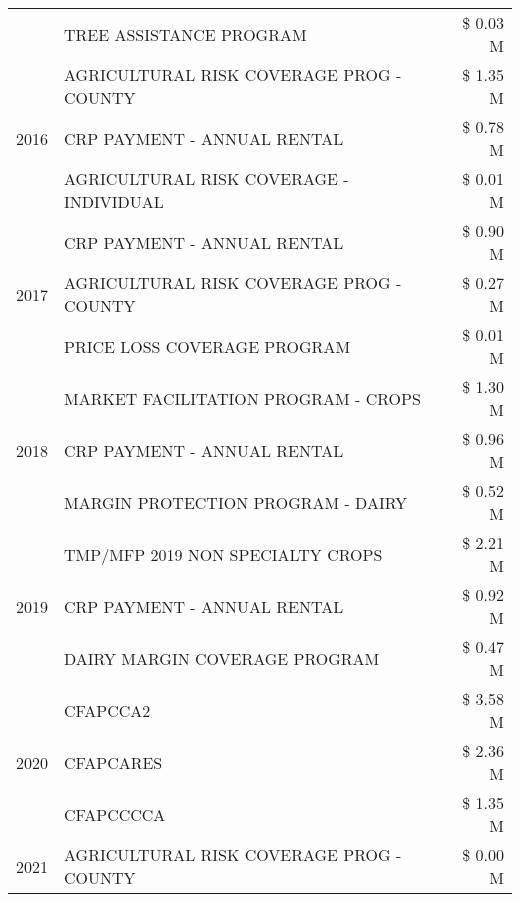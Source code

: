 \begin{tabular}{llr}
 & TREE ASSISTANCE PROGRAM & \$ 0.03 M \\
\cline{1-3}
\multirow[t]{3}{*}{2016} & AGRICULTURAL RISK COVERAGE PROG - COUNTY & \$ 1.35 M \\
 & CRP PAYMENT - ANNUAL RENTAL & \$ 0.78 M \\
 & AGRICULTURAL RISK COVERAGE - INDIVIDUAL & \$ 0.01 M \\
\cline{1-3}
\multirow[t]{3}{*}{2017} & CRP PAYMENT - ANNUAL RENTAL & \$ 0.90 M \\
 & AGRICULTURAL RISK COVERAGE PROG - COUNTY & \$ 0.27 M \\
 & PRICE LOSS COVERAGE PROGRAM & \$ 0.01 M \\
\cline{1-3}
\multirow[t]{3}{*}{2018} & MARKET FACILITATION PROGRAM - CROPS & \$ 1.30 M \\
 & CRP PAYMENT - ANNUAL RENTAL & \$ 0.96 M \\
 & MARGIN PROTECTION PROGRAM - DAIRY & \$ 0.52 M \\
\cline{1-3}
\multirow[t]{3}{*}{2019} & TMP/MFP 2019 NON SPECIALTY CROPS & \$ 2.21 M \\
 & CRP PAYMENT - ANNUAL RENTAL & \$ 0.92 M \\
 & DAIRY MARGIN COVERAGE PROGRAM & \$ 0.47 M \\
\cline{1-3}
\multirow[t]{3}{*}{2020} & CFAPCCA2 & \$ 3.58 M \\
 & CFAPCARES & \$ 2.36 M \\
 & CFAPCCCCA & \$ 1.35 M \\
\cline{1-3}
2021 & AGRICULTURAL RISK COVERAGE PROG - COUNTY & \$ 0.00 M \\
\cline{1-3}
\bottomrule
\end{tabular}
